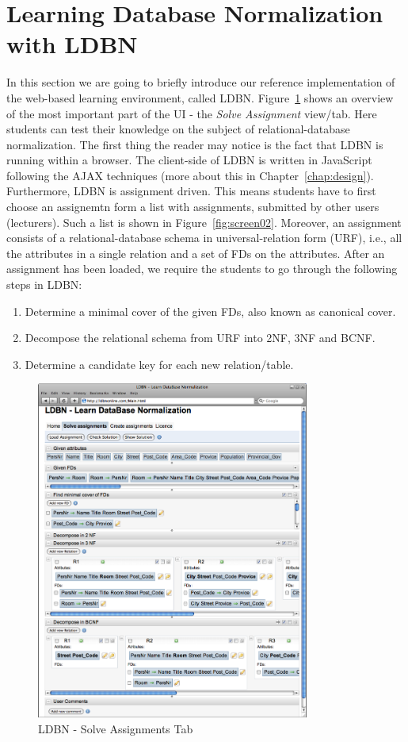\section{Learning Database Normalization with LDBN}
\label{sec:introldbn}
In this section we are going to briefly introduce our reference implementation
of the web-based learning environment, called LDBN.    
Figure~\ref{fig:screen01} shows an overview of the most important part of the UI - 
the \textit{Solve Assignment} view/tab. Here students can test their knowledge on 
the subject of relational-database normalization. The first thing the reader 
may notice is the fact that LDBN is running within a browser. The client-side 
of LDBN is written in JavaScript following the AJAX techniques 
(more about this in Chapter~\ref{chap:design}). 
Furthermore, LDBN is assignment driven. This means students have to first 
choose an assignemtn 
form a list with assignments, submitted by other users (lecturers). 
Such a list is shown in Figure~\ref{fig:screen02}. 
Moreover, an assignment consists of a relational-database schema in
universal-relation form (URF), i.e., all the attributes in a single relation 
and a set of FDs on the attributes. 
After an assignment has been loaded, we require the students to go through the 
following steps in LDBN:
\begin{enumerate}
	\item Determine a minimal cover of the given FDs, also known as canonical cover.
	\item Decompose the relational schema from URF into 2NF, 3NF and BCNF. 
	\item Determine a candidate key for each new relation/table. 
\end{enumerate}

\begin{figure}[h]
	\begin{center}
		\includegraphics[width=0.8\textwidth]{./img/screen01b.png}
		\caption{LDBN - Solve Assignments Tab}
		\label{fig:screen01}
	\end{center}
\end{figure}

